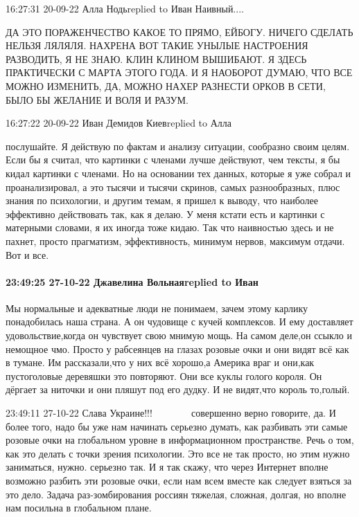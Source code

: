 



16:27:31 20-09-22
Алла Нодьreplied to Иван
Наивный....

ДА ЭТО ПОРАЖЕНЧЕСТВО КАКОЕ ТО ПРЯМО, ЕЙБОГУ. НИЧЕГО СДЕЛАТЬ НЕЛЬЗЯ ЛЯЛЯЛЯ.
НАХРЕНА ВОТ ТАКИЕ УНЫЛЫЕ НАСТРОЕНИЯ РАЗВОДИТЬ, Я НЕ ЗНАЮ. КЛИН КЛИНОМ ВЫШИБАЮТ.
Я ЗДЕСЬ ПРАКТИЧЕСКИ С МАРТА ЭТОГО ГОДА. И Я НАОБОРОТ ДУМАЮ, ЧТО ВСЕ МОЖНО
ИЗМЕНИТЬ, ДА, МОЖНО НАХЕР РАЗНЕСТИ ОРКОВ В СЕТИ, БЫЛО БЫ ЖЕЛАНИЕ И ВОЛЯ И
РАЗУМ.

16:27:22 20-09-22
Иван Демидов Киевreplied to Алла

послушайте. Я действую по фактам и анализу ситуации, сообразно своим целям.
Если бы я считал, что картинки с членами лучше действуют, чем тексты, я бы
кидал картинки с членами. Но на основании тех данных, которые я уже собрал и
проанализировал, а это тысячи и тысячи скринов, самых разнообразных, плюс
знания по психологии, и другим темам, я пришел к выводу, что наиболее
эффективно действовать так, как я делаю. У меня кстати есть и картинки с
матерными словами, я их иногда тоже кидаю. Так что наивностью здесь и не
пахнет, просто прагматизм, эффективность, минимум нервов, максимум отдачи. Вот
и все.

\paragraph{23:49:25 27-10-22 Джавелина Вольнаяreplied to Иван}

Мы нормальные и адекватные люди не понимаем, зачем этому карлику понадобилась
наша страна. А он чудовище с кучей комплексов. И ему доставляет
удовольствие,когда он чувствует свою мнимую мощь. На самом деле,он ссыкло и
немощное чмо. Просто у рабсеянцев на глазах розовые очки и они видят всё как в
тумане. Им рассказали,что у них всё хорошо,а Америка враг и они,как
пустоголовые деревяшки это повторяют. Они все куклы голого короля. Он дёргает
за ниточки и они пляшут под его дудку. И не видят,что король то,голый.

23:49:11 27-10-22
Слава Украине!!! 💛 💙 💛 💙 💛 💙 совершенно верно говорите, да. И более того,
надо бы уже нам начинать серьезно думать, как разбивать эти самые розовые очки
на глобальном уровне в информационном пространстве. Речь о том, как это делать
с точки зрения психологии. Это все не так просто, но этим нужно заниматься,
нужно. серьезно так. И я так скажу, что через Интернет вполне возможно разбить
эти розовые очки, если нам всем вместе как следует взяться за это дело. Задача
раз-зомбирования россиян тяжелая, сложная, долгая, но вполне нам посильна в
глобальном плане.


